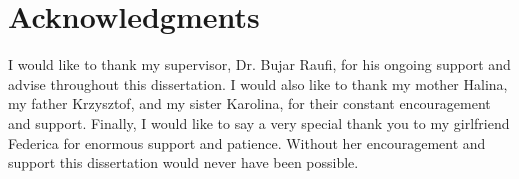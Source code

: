 \documentclass[oneside,12pt]{book}
\begin{document}
\chapter*{Acknowledgments}
\par I would like to thank my supervisor, Dr. Bujar Raufi, for his ongoing support and advise
throughout this dissertation.\smallskip \newline 
I would also like to thank  my mother Halina, my father Krzysztof, and my sister Karolina, for their constant encouragement and support.\smallskip \newline
Finally, I would like to say a very special thank you to my girlfriend Federica for enormous support and patience. Without her encouragement and support this dissertation would never have been possible.

\newpage
\tableofcontents

\listoffigures

\listoftables

\lstlistoflistings


\newpage

\fancyhead[RE,LO]{\leftmark}
\renewcommand{\headrulewidth}{2pt}



\end{document}
